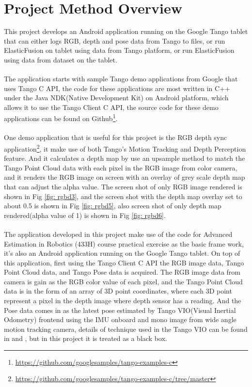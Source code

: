 \documentclass[12pt,twoside]{article}
\begin{document}
\newpage


\section{Project Method Overview}
This project develops an Android application running on the Google Tango \citep{tango} tablet that can either logs RGB, depth and pose data from Tango to files, or run ElasticFusion on tablet using data from Tango platform, or run ElasticFusion using data from dataset on the tablet.\\
\\
The application starts with sample Tango demo applications from Google that uses Tango C API, the code for these applications are most written in C++ under the Java NDK(Native Development Kit) on Android platform, which allows it to use the Tango Client C API, the source code for these demo applications can be found on Github\footnote{\url{https://github.com/googlesamples/tango-examples-c}}.\\
\\
One demo application that is useful for this project is the RGB depth sync application\footnote{\url{https://github.com/googlesamples/tango-examples-c/tree/master}}, it make use of both Tango's Motion Tracking and Depth Perception feature. And it calculates a depth map by use an upsample method to match the Tango Point Cloud data with each pixel in the RGB image from color camera, and it renders the RGB image on screen with an overlay of grey scale depth map that can adjust the alpha value. The  screen shot of only RGB image rendered is shown in Fig \ref{fig: rgbd3}, and the screen shot with the depth map overlay set to about 0.5 is shown in Fig \ref{fig: rgbd5}, also screen shot of only depth map rendered(alpha value of 1) is shown in
Fig \ref{fig: rgbd6}.\\
\\
The application developed in this project make use of the code for Advanced Estimation in Robotics (433H) course practical exercise as the basic frame work, it's also an Android application running on the Google Tango tablet. On top of this application, first using the Tango Client C API the RGB image data, Tango Point Cloud data, and Tango Pose data is acquired. The RGB image data from camera is gain as the RGB color value of each pixel, and the Tango Point Cloud data is in the form of an array of 3D point coordinates, where each 3D point represent a pixel in the depth image where depth sensor has a reading. And the Pose data comes in as the latest pose estimated by Tango VIO(Visual Inertial Odometry) frontend using the IMU onboard and mono image from wide angle motion tracking camera, details of technique used in the Tango VIO can be found in \cite{mourikis2007multi} and \cite{kottas2013consistency}, but in this project it is treated as a black box.\\
\end{document}
